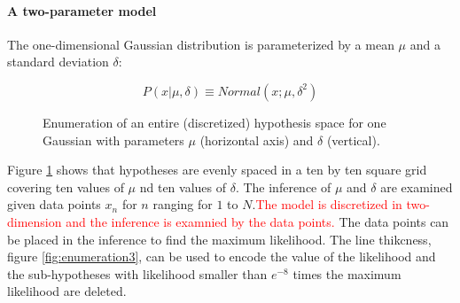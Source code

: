 \documentclass[11pt]{article}
\begin{document}
\paragraph{A two-parameter model}
The one-dimensional Gaussian distribution is parameterized by a mean $\mu$ and a standard deviation $\delta$:

\begin{equation}
  P(x | \mu, \delta) \equiv Normal(x; \mu, \delta^2)
\end{equation}

\begin{figure}[H]
\centering
 \caption{Enumeration of an entire (discretized) hypothesis space for one Gaussian with parameters $\mu$ (horizontal axis) and $\delta$ (vertical).}
 \label{fig:enumeration1}
\end{figure}

Figure \ref{fig:enumeration1} shows  that hypotheses are evenly spaced in a ten by ten square grid covering ten values of $\mu$ nd ten values of $\delta$. The inference of $\mu$ and $\delta$ are examined given data points $x_n$ for $n$ ranging for $1$ to $N$.\textcolor{red}{The model is discretized in two-dimension and the inference is examnied by the data points.} The data points can be placed in the inference to find the maximum likelihood. The line thikcness, figure \ref{fig:enumeration3}, can be used to encode the value of the likelihood and the sub-hypotheses with likelihood smaller than $e^{-8}$ times the maximum likelihood are deleted.
\end{document}
